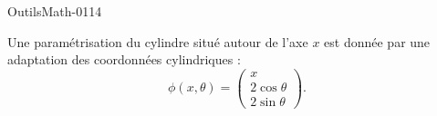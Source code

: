 
\begin{corrige}{OutilsMath-0114}

    Une paramétrisation du cylindre situé autour de l'axe $x$ est donnée par une adaptation des coordonnées cylindriques :
    \begin{equation}
        \phi(x,\theta)=\begin{pmatrix}
            x    \\ 
            2\cos\theta    \\ 
            2\sin\theta    
        \end{pmatrix}.
    \end{equation}
    

\end{corrige}
